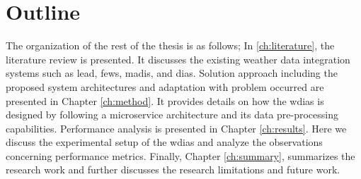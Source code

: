 \section{Outline}
The organization of the rest of the thesis is as follows; In \cref{ch:literature}, the literature review is presented. It discusses the existing weather data integration systems such as \acrshort{lead}, \acrshort{fews}, \acrshort{madis}, and \acrshort{dias}. Solution approach including the proposed system architectures and adaptation with problem occurred are presented in Chapter \ref{ch:method}. It provides details on how the \acrshort{wdias} is designed by following a microservice architecture and its data pre-processing capabilities. Performance analysis is presented in Chapter \ref{ch:results}. Here we discuss the experimental setup of the \acrshort{wdias} and analyze the observations concerning performance metrics. Finally, Chapter \ref{ch:summary}, summarizes the research work and further discusses the research limitations and future work.
